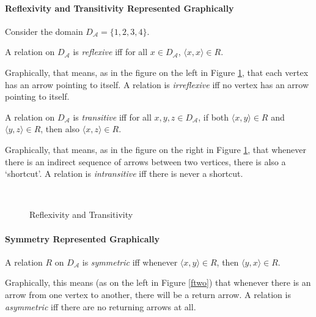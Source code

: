 \paragraph{Reflexivity and Transitivity Represented Graphically}

Consider the domain $D_{\mathscr{A}}=\{1,2,3,4\}$.

\begin{definition}[Reflexive]
	A relation on $D_{\mathscr{A}}$ is \emph{reflexive} iff for all $x\in D_{\mathscr{A}}$, $\langle x,x\rangle\in R$. 
\end{definition}Graphically, that means, as in the figure on the left in Figure \ref{fone}, that each vertex has an arrow pointing to itself. A relation is \emph{irreflexive} iff no vertex has an arrow pointing to itself.

\begin{definition}[Transitive]
	A relation on $D_{\mathscr{A}}$ is \emph{transitive} iff for all $x,y,z\in D_{\mathscr{A}}$, if both $\langle x,y\rangle\in R$ and $\langle y,z\rangle\in R$, then also $\langle x,z\rangle\in R$.
\end{definition} Graphically, that means, as in the figure on the right in Figure \ref{fone}, that whenever there is an indirect sequence of arrows between two vertices, there is also a `shortcut'. A relation is \emph{intransitive} iff there is never a shortcut.

\begin{figure}
\begin{center}
	{~\qquad\qquad}{}
\end{center}	\caption{Reflexivity and Transitivity\label{fone}}
\end{figure}


\paragraph{Symmetry Represented Graphically}

\begin{definition}[Symmetric]
	A relation $R$ on $D_{\mathscr{A}}$ is \emph{symmetric} iff whenever $\langle x,y\rangle \in R$, then $\langle y,x\rangle \in R$.
\end{definition} Graphically, this means (as on the left in Figure \ref{ftwo}) that whenever there is an arrow from one vertex to another, there will be a return arrow. A relation is \emph{asymmetric} iff there are no returning arrows at all.

